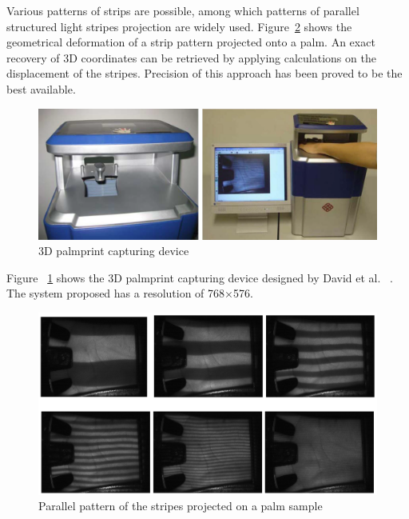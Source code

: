 Various patterns of strips are possible, among which patterns of parallel structured light stripes projection are widely used. Figure~\ref{fig:pastwork:strippattern} shows the geometrical deformation of a strip pattern projected onto a palm. An exact recovery of 3D coordinates can be retrieved by applying calculations on the displacement of the stripes. Precision of this approach has been proved to be the best available.

\begin{figure}[htb]
\begin{center}
\includegraphics[width=0.9\linewidth]{ch-pastwork/figures/device}
\caption{3D palmprint capturing device}
\label{fig:pastwork:device}
\end{center}
\end{figure}

Figure ~\ref{fig:pastwork:device} shows the 3D palmprint capturing device designed by David et al. ~\cite{Zhang:2008kc}. The system proposed has a resolution of 768$\times$576.

\begin{figure}[htb]
\begin{center}
\includegraphics[width=0.9\linewidth]{ch-pastwork/figures/strippattern}
\caption[Parallel pattern of the stripes projected on a palm sample]{Parallel pattern of the stripes projected on a palm sample~\cite{Li:2009eq}}
\label{fig:pastwork:strippattern}
\end{center}
\end{figure}

